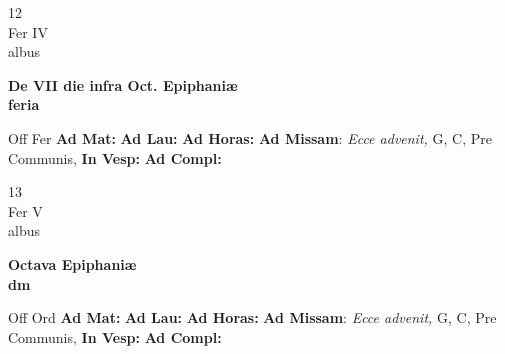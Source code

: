 \documentclass[10pt, openany]{book}
\begin{document}
        \begin{center}
            \begin{minipage}{3.5in}
                \vspace{2em}
                \begin{minipage}{0.5in}
                    {\Huge 12} \\
                    {\normalsize Fer IV} \\
                    {\normalsize albus}
                \end{minipage}
                \begin{minipage}{3.0in}
                    \textbf{ \large De VII die infra Oct. Epiphaniæ \\
                    \textnormal{\normalsize feria}} \\ 
                \end{minipage}
                \begin{justify}Off Fer
                    \textbf{Ad Mat: }
                    \textbf{Ad Lau: }
                    \textbf{Ad Horas: }\textbf{Ad Missam}: \textit{Ecce advenit,} G, C, Pre Communis,  
                    \textbf{In Vesp: }
                    \textbf{Ad Compl: }
                \end{justify}
            \end{minipage}
        \end{center}
    
        \begin{center}
            \begin{minipage}{3.5in}
                \vspace{2em}
                \begin{minipage}{0.5in}
                    {\Huge 13} \\
                    {\normalsize Fer V} \\
                    {\normalsize albus}
                \end{minipage}
                \begin{minipage}{3.0in}
                    \textbf{ \large Octava Epiphaniæ \\
                    \textnormal{\normalsize dm}} \\ 
                \end{minipage}
                \begin{justify}Off Ord
                    \textbf{Ad Mat: }
                    \textbf{Ad Lau: }
                    \textbf{Ad Horas: }\textbf{Ad Missam}: \textit{Ecce advenit,} G, C, Pre Communis,  
                    \textbf{In Vesp: }
                    \textbf{Ad Compl: }
                \end{justify}
            \end{minipage}
        \end{center}
    
\end{document}
